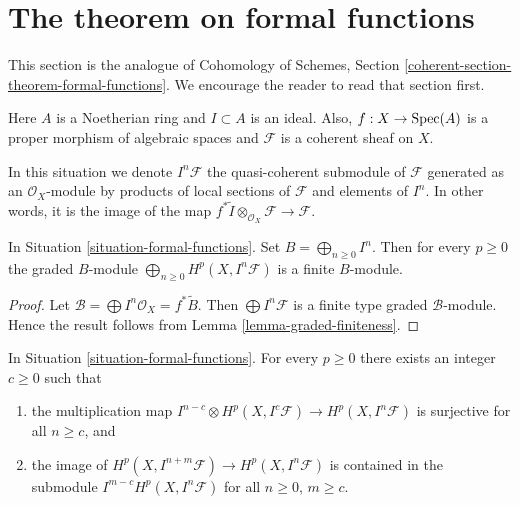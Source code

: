 \section{The theorem on formal functions}
\label{section-theorem-formal-functions}

\noindent
This section is the analogue of
Cohomology of Schemes, Section \ref{coherent-section-theorem-formal-functions}.
We encourage the reader to read that section first.

\begin{situation}
\label{situation-formal-functions}
Here $A$ is a Noetherian ring and $I \subset A$ is an ideal.
Also, $f : X \to \mathop{\mathrm{Spec}}(A)$ is a proper morphism of algebraic spaces
and $\mathcal{F}$ is a coherent sheaf on $X$.
\end{situation}

\noindent
In this situation we denote $I^n\mathcal{F}$ the quasi-coherent
submodule of $\mathcal{F}$ generated as an $\mathcal{O}_X$-module
by products of local sections of $\mathcal{F}$ and elements of $I^n$.
In other words, it is the image of the map
$f^*\widetilde{I} \otimes_{\mathcal{O}_X} \mathcal{F} \to \mathcal{F}$.

\begin{lemma}
\label{lemma-cohomology-powers-ideal-times-F}
In Situation \ref{situation-formal-functions}.
Set $B = \bigoplus_{n \geq 0} I^n$.
Then for every $p \geq 0$ the graded $B$-module
$\bigoplus_{n \geq 0} H^p(X, I^n\mathcal{F})$ is
a finite $B$-module.
\end{lemma}

\begin{proof}
Let $\mathcal{B} = \bigoplus I^n\mathcal{O}_X = f^*\widetilde{B}$.
Then $\bigoplus I^n\mathcal{F}$ is a finite type
graded $\mathcal{B}$-module. Hence the result follows
from Lemma \ref{lemma-graded-finiteness}.
\end{proof}

\begin{lemma}
\label{lemma-cohomology-powers-ideal-application}
In Situation \ref{situation-formal-functions}.
For every $p \geq 0$ there exists an integer $c \geq 0$ such that
\begin{enumerate}
\item the multiplication map
$I^{n - c} \otimes H^p(X, I^c\mathcal{F}) \to H^p(X, I^n\mathcal{F})$
is surjective for all $n \geq c$, and
\item the image of $H^p(X, I^{n + m}\mathcal{F}) \to H^p(X, I^n\mathcal{F})$
is contained in the submodule $I^{m - c} H^p(X, I^n\mathcal{F})$
for all $n \geq 0$, $m \geq c$.
\end{enumerate}
\end{lemma}

